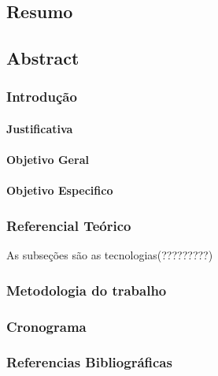 \documentclass[a4paper, 12pt]{article}
\begin{document}
\begin{center}
\part*{Resumo}
\end{center}

\begin{center}
\part*{Abstract}
\end{center}

\section{Introdução}
\subsection{Justificativa}
\subsection{Objetivo Geral}
\subsection{Objetivo Especifico}

\section{Referencial Teórico}
As subseções são as tecnologias(?????????)

\section{Metodologia do trabalho}

\section{Cronograma}

\section{Referencias Bibliográficas}
\end{document}
